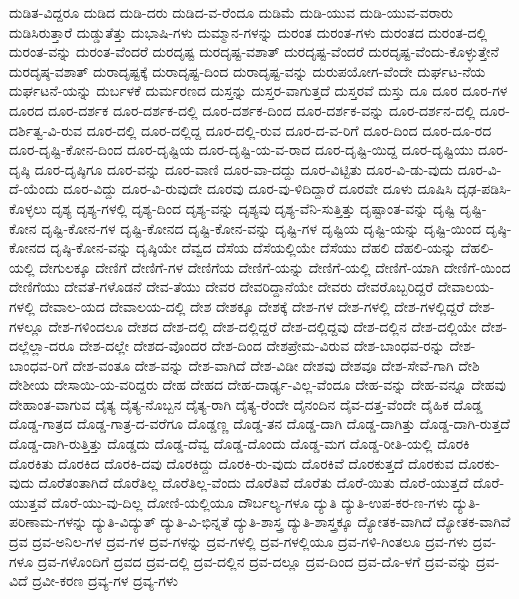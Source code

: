 {ದುಡಿತ-ವಿದ್ದರೂ
ದುಡಿದ
ದುಡಿ-ದರು
ದುಡಿದ-ವ-ರೆಂದೂ
ದುಡಿಮೆ
ದುಡಿ-ಯುವ
ದುಡಿ-ಯುವ-ವರಾರು
ದುಡಿಸಿರುತ್ತಾರೆ
ದುಡ್ಡುತೆತ್ತು
ದುಭಾಷಿ-ಗಳು
ದುಮ್ಮಾನ-ಗಳನ್ನು
ದುರಂತ
ದುರಂತ-ಗಳು
ದುರಂತದ
ದುರಂತ-ದಲ್ಲಿ
ದುರಂತ-ವನ್ನು
ದುರಂತ-ವೆಂದರೆ
ದುರದೃಷ್ಟ
ದುರದೃಷ್ಟ-ವಶಾತ್
ದುರದೃಷ್ಟ-ವೆಂದರೆ
ದುರದೃಷ್ಟ-ವೆಂದು-ಕೊಳ್ಳುತ್ತೇನೆ
ದುರದೃಷ್ಠ-ವಶಾತ್
ದುರಾದೃಷ್ಟಕ್ಕೆ
ದುರಾದೃಷ್ಟ-ದಿಂದ
ದುರಾದೃಷ್ಟ-ವನ್ನು
ದುರುಪಯೋಗ-ವೆಂದೇ
ದುರ್ಘಟ-ನೆಯ
ದುರ್ಘಟನೆ-ಯನ್ನು
ದುರ್ಬಳಕೆ
ದುರ್ಮರಣದ
ದುಸ್ತನ್ನು
ದುಸ್ತರ-ವಾಗುತ್ತದೆ
ದುಸ್ತರವೆ
ದುಸ್ತು
ದೂ
ದೂರ
ದೂರ-ಗಳ
ದೂರದ
ದೂರ-ದರ್ಶಕ
ದೂರ-ದರ್ಶಕ-ದಲ್ಲಿ
ದೂರ-ದರ್ಶಕ-ದಿಂದ
ದೂರ-ದರ್ಶಕ-ವನ್ನು
ದೂರ-ದರ್ಶನ-ದಲ್ಲಿ
ದೂರ-ದರ್ಶಿತ್ವ-ವಿ-ರುವ
ದೂರ-ದಲ್ಲಿ
ದೂರ-ದಲ್ಲಿದ್ದ
ದೂರ-ದಲ್ಲಿ-ರುವ
ದೂರ-ದ-ವ-ರಿಗೆ
ದೂರ-ದಿಂದ
ದೂರ-ದೂ-ರದ
ದೂರ-ದೃಷ್ಟಿ-ಕೋನ-ದಿಂದ
ದೂರ-ದೃಷ್ಟಿಯ
ದೂರ-ದೃಷ್ಟಿ-ಯ-ವ-ರಾದ
ದೂರ-ದೃಷ್ಟಿ-ಯಿದ್ದ
ದೂರ-ದೃಷ್ಟಿಯು
ದೂರ-ದೃಷ್ಠಿ
ದೂರ-ದೃಷ್ಠಿಗೂ
ದೂರ-ವನ್ನು
ದೂರ-ವಾಣಿ
ದೂರ-ವಾ-ದದ್ದು
ದೂರ-ವಿಟ್ಟಿತು
ದೂರ-ವಿ-ಡು-ವುದು
ದೂರ-ವಿ-ದೆ-ಯೆಂದು
ದೂರ-ವಿದ್ದು
ದೂರ-ವಿ-ರುವುದೇ
ದೂರವು
ದೂರ-ವು-ಳಿದಿದ್ದಾರೆ
ದೂರವೇ
ದೂಳು
ದೂಷಿಸಿ
ದೃಢ-ಪಡಿಸಿ-ಕೊಳ್ಳಲು
ದೃಶ್ಯ
ದೃಶ್ಯ-ಗಳಲ್ಲಿ
ದೃಶ್ಯ-ದಿಂದ
ದೃಶ್ಯ-ವನ್ನು
ದೃಶ್ಯವು
ದೃಶ್ಯ-ವೆನಿ-ಸುತ್ತಿತ್ತು
ದೃಷ್ಟಾಂತ-ವನ್ನು
ದೃಷ್ಟಿ
ದೃಷ್ಟಿ-ಕೋನ
ದೃಷ್ಟಿ-ಕೋನ-ಗಳ
ದೃಷ್ಟಿ-ಕೋನದ
ದೃಷ್ಟಿ-ಕೋನ-ವನ್ನು
ದೃಷ್ಟಿ-ಗಳ
ದೃಷ್ಟಿಯ
ದೃಷ್ಟಿ-ಯನ್ನು
ದೃಷ್ಟಿ-ಯಿಂದ
ದೃಷ್ಠಿ-ಕೋನದ
ದೃಷ್ಠಿ-ಕೋನ-ವನ್ನು
ದೃಷ್ಠಿಯೇ
ದೆವ್ವದ
ದೆಸೆಯ
ದೆಸೆಯಲ್ಲಿಯೇ
ದೆಸೆಯು
ದೆಹಲಿ
ದೆಹಲಿ-ಯನ್ನು
ದೆಹಲಿ-ಯಲ್ಲಿ
ದೇಗುಲಕ್ಕೂ
ದೇಣಿಗೆ
ದೇಣಿಗೆ-ಗಳ
ದೇಣಿಗೆಯ
ದೇಣಿಗೆ-ಯನ್ನು
ದೇಣಿಗೆ-ಯಲ್ಲಿ
ದೇಣಿಗೆ-ಯಾಗಿ
ದೇಣಿಗೆ-ಯಿಂದ
ದೇಣಿಗೆಯು
ದೇವತೆ-ಗಳೊಡನೆ
ದೇವ-ತೆಯು
ದೇವರ
ದೇವರಿದ್ದಾನೆಯೇ
ದೇವರು
ದೇವರೊಬ್ಬರಿದ್ದರೆ
ದೇವಾಲಯ-ಗಳಲ್ಲಿ
ದೇವಾಲ-ಯದ
ದೇವಾಲಯ-ದಲ್ಲಿ
ದೇಶ
ದೇಶಕ್ಕೂ
ದೇಶಕ್ಕೆ
ದೇಶ-ಗಳ
ದೇಶ-ಗಳಲ್ಲಿ
ದೇಶ-ಗಳಲ್ಲಿದ್ದರೆ
ದೇಶ-ಗಳಲ್ಲೂ
ದೇಶ-ಗಳಿಂದಲೂ
ದೇಶದ
ದೇಶ-ದಲ್ಲಿ
ದೇಶ-ದಲ್ಲಿದ್ದರೆ
ದೇಶ-ದಲ್ಲಿದ್ದವು
ದೇಶ-ದಲ್ಲಿನ
ದೇಶ-ದಲ್ಲಿಯೇ
ದೇಶ-ದಲ್ಲೆಲ್ಲಾ-ದರೂ
ದೇಶ-ದಲ್ಲೇ
ದೇಶದ-ವೊಂದರ
ದೇಶ-ದಿಂದ
ದೇಶಪ್ರೇಮ-ವಿರುವ
ದೇಶ-ಬಾಂಧವ-ರನ್ನು
ದೇಶ-ಬಾಂಧವ-ರಿಗೆ
ದೇಶ-ವಂತೂ
ದೇಶ-ವನ್ನು
ದೇಶ-ವಾಗಿದೆ
ದೇಶ-ವಿಡೀ
ದೇಶವು
ದೇಶವೂ
ದೇಶ-ಸೇವೆ-ಗಾಗಿ
ದೇಶಿ
ದೇಶೀಯ
ದೇಸಾಯಿ-ಯ-ವರಿದ್ದರು
ದೇಹ
ದೇಹದ
ದೇಹ-ದಾರ್ಢ್ಯ-ವಿಲ್ಲ-ವೆಂದೂ
ದೇಹ-ವನ್ನು
ದೇಹ-ವನ್ನೂ
ದೇಹವು
ದೇಹಾಂತ-ವಾಗುವ
ದೈತ್ಯ
ದೈತ್ಯ-ನೊಬ್ಬನ
ದೈತ್ಯ-ರಾಗಿ
ದೈತ್ಯ-ರೆಂದೇ
ದೈನಂದಿನ
ದೈವ-ದತ್ತ-ವೆಂದೇ
ದೈಹಿಕ
ದೊಡ್ಡ
ದೊಡ್ಡ-ಗಾತ್ರದ
ದೊಡ್ಡ-ಗಾತ್ರ-ದ-ವರೆಗೂ
ದೊಡ್ಡಣ್ಣ
ದೊಡ್ಡ-ತನ
ದೊಡ್ಡ-ದಾಗಿ
ದೊಡ್ಡ-ದಾಗಿತ್ತು
ದೊಡ್ಡ-ದಾಗಿ-ರುತ್ತದೆ
ದೊಡ್ಡ-ದಾಗಿ-ರುತ್ತಿತ್ತು
ದೊಡ್ಡದು
ದೊಡ್ಡ-ದೆವ್ವ
ದೊಡ್ಡ-ದೊಂದು
ದೊಡ್ಡ-ಮಗ
ದೊಡ್ಡ-ರೀತಿ-ಯಲ್ಲಿ
ದೊರಕಿ
ದೊರಕಿತು
ದೊರಕಿದ
ದೊರಕಿ-ದವು
ದೊರಕಿದ್ದು
ದೊರಕಿ-ರು-ವುದು
ದೊರಕಿವೆ
ದೊರಕುತ್ತದೆ
ದೊರಕುವ
ದೊರಕು-ವುದು
ದೊರೆತಂತಾಗಿದೆ
ದೊರೆತಿಲ್ಲ
ದೊರೆತಿಲ್ಲ-ವೆಂದು
ದೊರೆತಿವೆ
ದೊರೆತು
ದೊರೆ-ಯಿತು
ದೊರೆ-ಯುತ್ತದೆ
ದೊರೆ-ಯುತ್ತವೆ
ದೊರೆ-ಯು-ವು-ದಿಲ್ಲ
ದೋಣಿ-ಯಲ್ಲಿಯೂ
ದೌರ್ಬಲ್ಯ-ಗಳೂ
ದ್ಯುತಿ
ದ್ಯುತಿ-ಉಪ-ಕರ-ಣ-ಗಳು
ದ್ಯುತಿ-ಪರಿಣಾಮ-ಗಳನ್ನು
ದ್ಯುತಿ-ವಿದ್ಯುತ್
ದ್ಯುತಿ-ವಿ-ಭಿನ್ನತೆ
ದ್ಯುತಿ-ಶಾಸ್ತ್ರ
ದ್ಯುತಿ-ಶಾಸ್ತ್ರಕ್ಕೂ
ದ್ಯೋತಕ-ವಾಗಿದೆ
ದ್ಯೋತಕ-ವಾಗಿವೆ
ದ್ರವ
ದ್ರವ-ಅನಿಲ-ಗಳ
ದ್ರವ-ಗಳ
ದ್ರವ-ಗಳನ್ನು
ದ್ರವ-ಗಳಲ್ಲಿ
ದ್ರವ-ಗಳಲ್ಲಿಯೂ
ದ್ರವ-ಗಳಿ-ಗಿಂತಲೂ
ದ್ರವ-ಗಳು
ದ್ರವ-ಗಳೂ
ದ್ರವ-ಗಳೊಂದಿಗೆ
ದ್ರವದ
ದ್ರವ-ದಲ್ಲಿ
ದ್ರವ-ದಲ್ಲಿನ
ದ್ರವ-ದಲ್ಲೂ
ದ್ರವ-ದಿಂದ
ದ್ರವ-ದೊ-ಳಗೆ
ದ್ರವ-ವನ್ನು
ದ್ರವ-ವಿದೆ
ದ್ರವೀ-ಕರಣ
ದ್ರವ್ಯ-ಗಳ
ದ್ರವ್ಯ-ಗಳು
}
